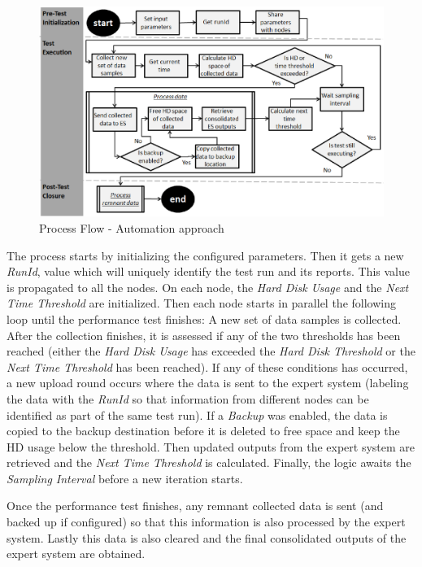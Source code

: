 \documentclass[runningheads,a4paper]{llncs}
\begin{document}
\begin{figure}[!h]
\centering
\includegraphics[width=1.0\textwidth]{ApproachDiagram}
\caption{Process Flow - Automation approach}
\label{fig_ApproachDiagram}
\end{figure}

The process starts by initializing the configured parameters. Then it gets
a new \emph{RunId}, value which will uniquely identify the test run and its reports.
This value is propagated to all the nodes. On each node, the \emph{Hard Disk
Usage} and  the \emph{Next Time Threshold} are initialized. Then each node
starts in parallel the following loop until the performance test finishes: A new
set of data samples is collected. After the collection finishes, it is assessed if any of
the two thresholds has been reached (either the \emph{Hard Disk Usage} has
exceeded the \emph{Hard Disk Threshold} or the \emph{Next Time Threshold} has
been reached). If any of these conditions has occurred, a new upload round
occurs where the data is sent to the expert system (labeling the data with the
\emph{RunId} so that information from different nodes can be identified as part
of the same test run). If a \emph{Backup} was enabled, the data is copied
to the backup destination before it is deleted to free space and
keep the HD usage below the threshold. Then updated outputs from the
expert system are retrieved and the \emph{Next Time Threshold} is calculated. Finally,
the logic awaits the \emph{Sampling Interval} before a new iteration
starts.

Once the performance test finishes, any remnant collected data is sent (and
backed up if configured) so that this information is also processed by the
expert system. Lastly this data is also cleared and the final consolidated
outputs of the expert system are obtained.
\end{document}
